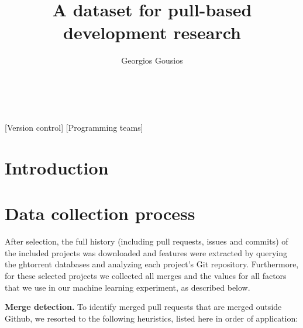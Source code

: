 \documentclass{sig-alternate}
\begin{document}
\newcommand{\todo}[1]{\textbf{TODO}\footnote{\textbf{TODO:} #1}}

\newcommand{\ghtorrent}{ \textsc{ght}orrent\xspace}
\newcommand{\api}{\textsc{api}\xspace}
\newcommand{\pullreq}{ \textsf{pullreq}\xspace}

\title{A dataset for pull-based development research}

\author{
\alignauthor
Georgios Gousios\\
       \\
       \\
}

\maketitle

\begin{abstract}


\end{abstract}

[Version control]
[Programming teams]



\section{Introduction}
\label{sec:intro}

\section{Data collection process}
\label{sec:expdata}

After selection, the full history (including pull requests, issues and commits)
of the included projects was downloaded and features were extracted by querying
the {\sc ght}orrent databases and analyzing each project's Git repository. 
Furthermore, for these selected projects we collected all merges and the values for all factors that we use in our machine learning experiment, as described below.

\textbf{Merge detection.} To
identify merged pull requests that are merged outside Github, we resorted to the following heuristics, listed here in order of application:
\end{document}
